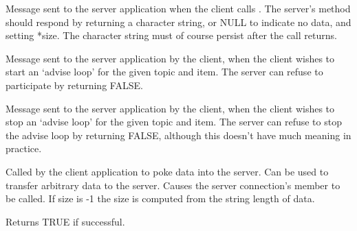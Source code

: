 \label{wxddeconnectiononrequest}


Message sent to the server application when the client calls 
. The
server's  method
should respond by returning a character string, or NULL to
indicate no data, and setting *size. The character string must of
course persist after the call returns.

\label{wxddeconnectiononstartadvise}


Message sent to the server application by the client, when the client
wishes to start an `advise loop' for the given topic and item. The
server can refuse to participate by returning FALSE.

\label{wxddeconnectiononstopadvise}


Message sent to the server application by the client, when the client
wishes to stop an `advise loop' for the given topic and item. The
server can refuse to stop the advise loop by returning FALSE, although
this doesn't have much meaning in practice.

\label{wxddeconnectionpoke}


Called by the client application to poke data into the server.
Can be used to transfer arbitrary data to the server. Causes the
server connection's  member to
be called. If size is -1 the size is computed from the string
length of data.

Returns TRUE if successful.

\label{wxddeconnectionrequest}


